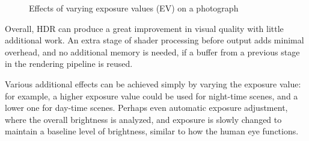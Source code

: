 \documentclass[11pt, oneside]{report}
\begin{document}
\begin{figure}[!htbp]
  \centering
  \hfill
  \hfill
  \hfill
  \hfill
  \caption{Effects of varying exposure values (EV) on a photograph}
\end{figure}

Overall, HDR can produce a great improvement in visual quality with little additional work. An extra stage of shader processing before output adds minimal overhead, and no additional memory is needed, if a buffer from a previous stage in the rendering pipeline is reused.

Various additional effects can be achieved simply by varying the exposure value: for example, a higher exposure value could be used for night-time scenes, and a lower one for day-time scenes. Perhaps even automatic exposure adjustment, where the overall brightness is analyzed, and exposure is slowly changed to maintain a baseline level of brightness, similar to how the human eye functions.
\end{document}
